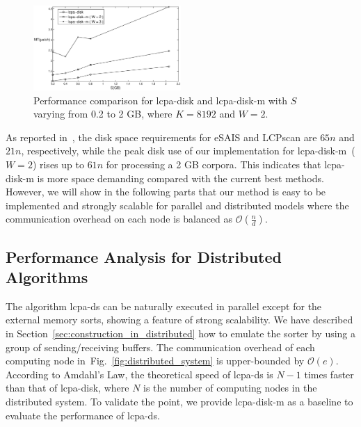 \documentclass[10pt,journal,compsoc]{IEEEtran}
\begin{document}
\begin{CJK*}{GBK}{song}
\begin{figure}[hbtp!]
  \centering
  \includegraphics[width=0.5\textwidth]{disk_vs_diskm.eps}
  \caption{Performance comparison for lcpa-disk and lcpa-disk-m with $S$ varying from 0.2 to 2 GB, where $K=8192$ and $W=2$.}
  \label{fig:disk_vs_diskm}
\end{figure}

As reported in~\cite{Juha2014}, the disk space requirements for eSAIS and LCPscan are $65n$ and $21n$, respectively, while the peak disk use of our implementation for lcpa-disk-m~($W=2$) rises up to $61n$ for processing a 2 GB corpora. This indicates that {lcpa-disk-m} is more space demanding compared with the current best methods. However, we will show in the following parts that our method is easy to be implemented and strongly scalable for parallel and distributed models where the communication overhead on each node is balanced as $\mathcal{O}(\frac{n}{d})$.


\subsection{Performance Analysis for Distributed Algorithms}

The algorithm lcpa-ds can be naturally executed in parallel except for the external memory sorts, showing a feature of strong scalability. We have described in Section~\ref{sec:construction_in_distributed} how to emulate the sorter by using a group of sending/receiving buffers. The communication overhead of each computing node in~Fig.~\ref{fig:distributed_system} is upper-bounded by $\mathcal{O}(e)$. According to Amdahl's Law, the theoretical speed of lcpa-ds is $N-1$ times faster than that of lcpa-disk, where $N$ is the number of computing nodes in the distributed system. To validate the point, we provide lcpa-disk-m as a baseline to evaluate the performance of lcpa-ds.


\end{CJK*}
\end{document}
